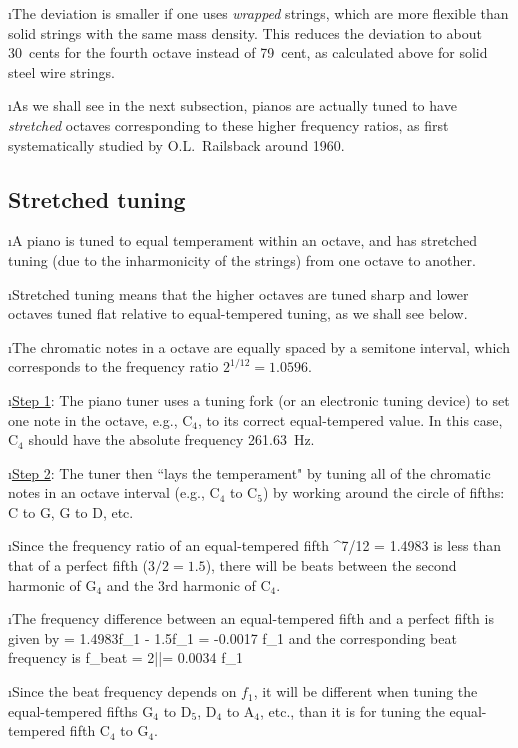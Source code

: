\i The deviation is smaller if one uses {\em wrapped}
strings, which are more flexible than solid strings
with the same mass density.
This reduces the deviation to about 30~cents for the
fourth octave instead of 79~cent, as calculated above
for solid steel wire strings.

\i As we shall see in the next subsection, pianos are 
actually tuned to have {\em stretched} octaves corresponding
to these higher frequency ratios, as first 
systematically studied by O.L.~Railsback around 1960.

\ei
\subsection{Stretched tuning}
\bi

\i A piano is tuned to equal temperament within an
octave, and has stretched tuning (due to the inharmonicity
of the strings) from one octave to another.

\i Stretched tuning means that the higher octaves are 
tuned sharp and lower octaves tuned flat relative
to equal-tempered tuning, as we shall see below.

\i The chromatic notes in a octave are equally spaced
by a semitone interval, which corresponds to the frequency
ratio $2^{1/12} = 1.0596$.

\i \underline{Step 1}: 
The piano tuner uses a tuning fork 
(or an electronic tuning device) to set one note in the 
octave, e.g., C${}_4$, to its correct equal-tempered
value.
In this case, C${}_4$ should have the absolute frequency 261.63~Hz.

\i \underline{Step 2}: 
The tuner then ``lays the temperament" by tuning all of 
the chromatic notes in an octave interval (e.g., C${}_4$ to 
C${}_5$) by working around the circle of
fifths: C to G, G to D, etc.

\i Since the frequency ratio of an equal-tempered fifth
%
^{7/12} = 1.4983
\ee
%
is less than that of a perfect fifth ($3/2=1.5$), there
will be beats between the second harmonic of G${}_4$ and
the 3rd harmonic of C${}_4$.

\i The frequency difference 
between an equal-tempered fifth and a perfect fifth 
is given by
%
\be
\delta = 1.4983f_1 - 1.5f_1 = -0.0017 f_1
\ee
and the corresponding beat frequency is
%
\be
f_{\rm beat} = 2|\delta|= 0.0034 f_1
\ee

\i Since the beat frequency depends on $f_1$, it will be
different when tuning the equal-tempered fifths 
G${}_4$ to D${}_5$, D${}_4$ to A${}_4$, etc., than it 
is for tuning the equal-tempered fifth C${}_4$ to G${}_4$.


